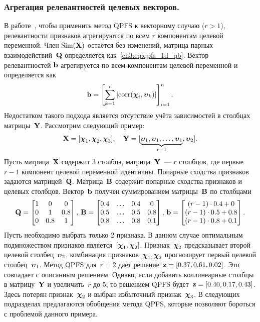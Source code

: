 \subsubsection{Агрегация релевантностей целевых векторов.}
В работе~\cite{motrenko2018multi}, чтобы применить метод QPFS к векторному случаю ($r > 1$), релевантности признаков агрегируются по всем $r$ компонентам целевой переменной. 
Член $\text{Sim}(\mathbf{X})$ остаётся без изменений, матрица парных взаимодействий~$\mathbf{Q}$ определяется как~\eqref{ch3:eq:qpfs_1d_qb}. 
Вектор релевантностей $\mathbf{b}$ агрегируется по всем компонентам целевой переменной и определяется как
\begin{equation*}
	\mathbf{b} = \left[\sum_{k=1}^r|\text{corr}(\boldsymbol{\chi}_i, \boldsymbol{\upsilon}_k)|\right]_{i=1}^n.
\end{equation*}
Недостатком такого подхода является отсутствие учёта зависимостей в столбцах матрицы~$\mathbf{Y}$. Рассмотрим следующий пример:
\begin{equation*}
	\mathbf{X} = [\boldsymbol{\chi}_1, \boldsymbol{\chi}_2, \boldsymbol{\chi}_3], \quad \mathbf{Y} = [\underbrace{\boldsymbol{\upsilon}_1, \boldsymbol{\upsilon}_1, \dots, \boldsymbol{\upsilon}_1}_{r-1}, \boldsymbol{\upsilon}_2].
\end{equation*}
Пусть матрица~$\mathbf{X}$ содержит 3 столбца, матрица~$\mathbf{Y}$~--- $r$ столбцов, где первые $r-1$ компонент целевой переменной идентичны.
Попарные сходства признаков задаются матрицей~$\mathbf{Q}$.
Матрица~$\mathbf{B}$ содержит попарные сходства признаков и целевых столбцов.
Вектор~$\mathbf{b}$ получен суммированием матрицы~$\mathbf{B}$ по столбцами
\begin{equation}
	\mathbf{Q} = \begin{bmatrix} 1 & 0 & 0\\ 0 & 1 & 0.8 \\ 0 & 0.8 & 1 \end{bmatrix}, \,
	\mathbf{B} = \begin{bmatrix} 0.4 & \dots & 0.4 & 0 \\ 0.5 & \dots & 0.5 & 0.8 \\ 0.8 & \dots & 0.8 & 0.1 \end{bmatrix}, \,
	\mathbf{b} = \begin{bmatrix} (r-1) \cdot 0.4 + 0 \\ (r-1) \cdot 0.5 + 0.8 \\ (r-1) \cdot 0.8 + 0.1 \end{bmatrix}.
	\label{ch3:eq:qpfs_example}
\end{equation}
Пусть необходимо выбрать только 2 признака.
В данном случае оптимальным подмножеством признаков является~$[\boldsymbol{\chi}_1, \boldsymbol{\chi}_2]$.
Признак~$\boldsymbol{\chi}_2$ предсказывает второй целевой столбец~$\boldsymbol{\upsilon}_2$, комбинация признаков~$\boldsymbol{\chi}_1, \boldsymbol{\chi}_2$ прогнозирует первый целевой столбец~$\boldsymbol{\upsilon}_1$.
Метод QPFS для~$r=2$ дает решение~$\mathbf{z} = [0.37, 0.61, 0.02]$. Это совпадает с описанным решением.
Однако, если добавить коллинеарные столбцы в матрицу~$\mathbf{Y}$ и увеличить~$r$ до 5, то решением QPFS будет~$\mathbf{z} = [0.40, 0.17, 0.43]$.
Здесь потерян признак~$\boldsymbol{\chi}_2$ и выбран избыточный признак~$\boldsymbol{\chi}_3$.
В следующих подразделах предлагаются обобщения метода QPFS, которые позволяют бороться с проблемой данного примера.

